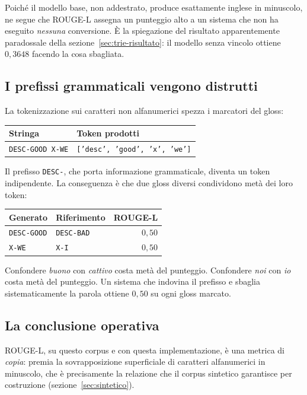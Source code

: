 Poiché il modello base, non addestrato, produce esattamente inglese in
minuscolo, ne segue che ROUGE-L assegna un punteggio alto a un sistema che non
ha eseguito \emph{nessuna} conversione. È la spiegazione del risultato
apparentemente paradossale della sezione~\ref{sec:trie-risultato}: il modello
senza vincolo ottiene $0{,}3648$ facendo la cosa sbagliata.

\subsection{I prefissi grammaticali vengono distrutti}

La tokenizzazione sui caratteri non alfanumerici spezza i marcatori del gloss:

\begin{center}
\begin{tabular}{ll}
\toprule
Stringa & Token prodotti \\
\midrule
\texttt{DESC-GOOD X-WE} & \texttt{['desc', 'good', 'x', 'we']} \\
\bottomrule
\end{tabular}
\end{center}

Il prefisso \texttt{DESC-}, che porta informazione grammaticale, diventa un
token indipendente. La conseguenza è che due gloss diversi condividono metà dei
loro token:

\begin{center}
\begin{tabular}{llr}
\toprule
Generato & Riferimento & ROUGE-L \\
\midrule
\texttt{DESC-GOOD} & \texttt{DESC-BAD} & $0{,}50$ \\
\texttt{X-WE} & \texttt{X-I} & $0{,}50$ \\
\bottomrule
\end{tabular}
\end{center}

Confondere \emph{buono} con \emph{cattivo} costa metà del punteggio. Confondere
\emph{noi} con \emph{io} costa metà del punteggio. Un sistema che indovina il
prefisso e sbaglia sistematicamente la parola ottiene $0{,}50$ su ogni gloss
marcato.

\subsection{La conclusione operativa}

ROUGE-L, su questo corpus e con questa implementazione, è una metrica di
\emph{copia}: premia la sovrapposizione superficiale di caratteri alfanumerici
in minuscolo, che è precisamente la relazione che il corpus sintetico garantisce
per costruzione (sezione~\ref{sec:sintetico}).

